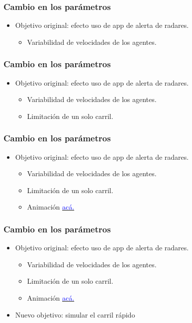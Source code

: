 \documentclass[10pt, compress]{beamer}
\begin{document}
\begin{frame}[fragile]
\frametitle{Cambio en los par\'ametros}

\begin{itemize}
\item Objetivo original: efecto uso de app de alerta de radares.
	\begin{itemize}
	\item Variabilidad de velocidades de los agentes.
	\end{itemize}
\end{itemize}
\addtocounter{framenumber}{-1}
\end{frame}

\begin{frame}[fragile]
\frametitle{Cambio en los par\'ametros}

\begin{itemize}
\item Objetivo original: efecto uso de app de alerta de radares.
	\begin{itemize}
	\item Variabilidad de velocidades de los agentes.
	\item Limitaci\'on de un solo carril.
	\end{itemize}
\end{itemize}
\addtocounter{framenumber}{-1}
\end{frame}

\begin{frame}[fragile]
\frametitle{Cambio en los par\'ametros}

\begin{itemize}
\item Objetivo original: efecto uso de app de alerta de radares.
	\begin{itemize}
	\item Variabilidad de velocidades de los agentes.
	\item Limitaci\'on de un solo carril.
	\item Animaci\'on \href{https://youtu.be/NnljPUTmnGE}{\textcolor{blue}{ac\'a.}}
	\end{itemize}
\end{itemize}
\addtocounter{framenumber}{-1}
\end{frame}

\begin{frame}[fragile]
\frametitle{Cambio en los par\'ametros}

\begin{itemize}
\item Objetivo original: efecto uso de app de alerta de radares.
	\begin{itemize}
	\item Variabilidad de velocidades de los agentes.
	\item Limitaci\'on de un solo carril.
	\item Animaci\'on \href{https://youtu.be/NnljPUTmnGE}{\textcolor{blue}{ac\'a.}}
	\end{itemize}
\item Nuevo objetivo: simular el carril r\'apido
\end{itemize}
\addtocounter{framenumber}{-1}
\end{frame}
\end{document}
